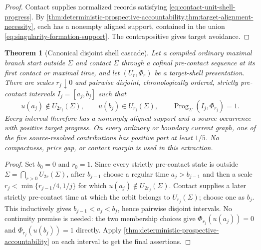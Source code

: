 \documentclass[11pt]{article}
\numberwithin{section}{part}
\theoremstyle{plain}
\newtheorem{theorem}{Theorem}[section]
\theoremstyle{definition}
\theoremstyle{remark}
\begin{document}
\begin{proof}
Contact supplies normalized records satisfying
\eqref{eq:contact-unit-shell-progress}.  By
\cref{thm:deterministic-prospective-accountability,thm:target-alignment-necessity},
each has a nonempty aligned support, contained in the union
\eqref{eq:singularity-formation-support}.  The contrapositive gives target
avoidance.
\end{proof}

\begin{theorem}[Canonical disjoint shell cascade]
\label{thm:canonical-disjoint-shell-cascade}
Let a compiled ordinary maximal branch start outside \(\Sigma\) and contact
\(\Sigma\) through a cofinal pre-contact sequence at its first contact or
maximal time, and let
\((U_r,\Phi_r)\) be a target-shell presentation.  There are scales
\(r_j\downarrow0\) and pairwise disjoint, chronologically ordered,
strictly pre-contact intervals \(I_j=[a_j,b_j]\) such that
\begin{equation}
 \label{eq:canonical-shell-cascade}
 u(a_j)\notin U_{2r_j}(\Sigma),\qquad
 u(b_j)\in U_{r_j}(\Sigma),\qquad
 \operatorname{Prog}_\Sigma(I_j,\Phi_{r_j})=1.
\end{equation}
Every interval therefore has a nonempty aligned support and a source
occurrence with positive target progress.  On every ordinary or boundary
current graph, one of the five source-resolved contributions has positive
part at least \(1/5\).  No
compactness, price gap, or contact margin is used in this extraction.
\end{theorem}

\begin{proof}
Set \(b_0=0\) and \(r_0=1\).  Since every strictly pre-contact state is outside
\(\Sigma=\bigcap_{r>0}U_{2r}(\Sigma)\), after \(b_{j-1}\) choose a regular
time \(a_j>b_{j-1}\) and then a scale
\(r_j<\min\{r_{j-1}/4,1/j\}\) for which
\(u(a_j)\notin U_{2r_j}(\Sigma)\).  Contact supplies a later strictly
pre-contact time at which the orbit belongs to \(U_{r_j}(\Sigma)\); choose
one as \(b_j\).  This inductively gives \(b_{j-1}<a_j<b_j\), hence pairwise
disjoint intervals.  No continuity premise is needed: the two membership
choices give \(\Phi_{r_j}(u(a_j))=0\) and
\(\Phi_{r_j}(u(b_j))=1\) directly.  Apply
\cref{thm:deterministic-prospective-accountability} on each interval to get
the final assertions.
\end{proof}
\end{document}
